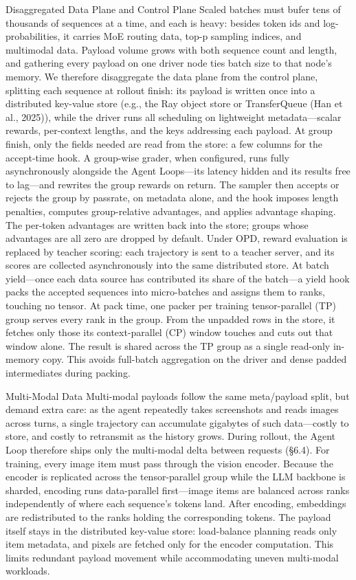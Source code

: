 \documentclass[
  10
]{article}
\begin{document}
Disaggregated Data Plane and Control Plane Scaled batches must bufer
tens of thousands of sequences at a time, and each is heavy: besides
token ids and log-probabilities, it carries MoE routing data, top-p
sampling indices, and multimodal data. Payload volume grows with both
sequence count and length, and gathering every payload on one driver
node ties batch size to that node's memory. We therefore disaggregate
the data plane from the control plane, splitting each sequence at
rollout finish: its payload is written once into a distributed key-value
store (e.g., the Ray object store or TransferQueue (Han et al., 2025)),
while the driver runs all scheduling on lightweight metadata---scalar
rewards, per-context lengths, and the keys addressing each payload. At
group finish, only the fields needed are read from the store: a few
columns for the accept-time hook. A group-wise grader, when configured,
runs fully asynchronously alongside the Agent Loops---its latency hidden
and its results free to lag---and rewrites the group rewards on return.
The sampler then accepts or rejects the group by passrate, on metadata
alone, and the hook imposes length penalties, computes group-relative
advantages, and applies advantage shaping. The per-token advantages are
written back into the store; groups whose advantages are all zero are
dropped by default. Under OPD, reward evaluation is replaced by teacher
scoring: each trajectory is sent to a teacher server, and its scores are
collected asynchronously into the same distributed store. At batch
yield---once each data source has contributed its share of the batch---a
yield hook packs the accepted sequences into micro-batches and assigns
them to ranks, touching no tensor. At pack time, one packer per training
tensor-parallel (TP) group serves every rank in the group. From the
unpadded rows in the store, it fetches only those its context-parallel
(CP) window touches and cuts out that window alone. The result is shared
across the TP group as a single read-only in-memory copy. This avoids
full-batch aggregation on the driver and dense padded intermediates
during packing.

Multi-Modal Data Multi-modal payloads follow the same meta/payload
split, but demand extra care: as the agent repeatedly takes screenshots
and reads images across turns, a single trajectory can accumulate
gigabytes of such data---costly to store, and costly to retransmit as
the history grows. During rollout, the Agent Loop therefore ships only
the multi-modal delta between requests (§6.4). For training, every image
item must pass through the vision encoder. Because the encoder is
replicated across the tensor-parallel group while the LLM backbone is
sharded, encoding runs data-parallel first---image items are balanced
across ranks independently of where each sequence's tokens land. After
encoding, embeddings are redistributed to the ranks holding the
corresponding tokens. The payload itself stays in the distributed
key-value store: load-balance planning reads only item metadata, and
pixels are fetched only for the encoder computation. This limits
redundant payload movement while accommodating uneven multi-modal
workloads.
\end{document}
